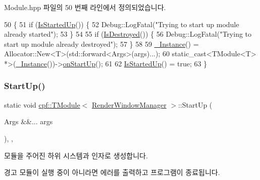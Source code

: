 Module.\+hpp 파일의 50 번째 라인에서 정의되었습니다.


\begin{DoxyCode}
50                                             \{
51             \textcolor{keywordflow}{if} (\hyperlink{classcpf_1_1_t_module_a73732afee7131dad652bf3e00c75cef9}{IsStartedUp}()) \{
52                 Debug::LogFatal(\textcolor{stringliteral}{"Trying to start up module already started"});
53             \}
54 
55             \textcolor{keywordflow}{if} (\hyperlink{classcpf_1_1_t_module_a9f70f0a70ac59b13b7a874f82c877337}{IsDestroyed}()) \{
56                 Debug::LogFatal(\textcolor{stringliteral}{"Trying to start up module already destroyed"});
57             \}
58 
59             \hyperlink{classcpf_1_1_t_module_a06ab8af8ea6b294959937fd2bbc1e615}{\_Instance}() = Allocator::New<T>(std::forward<Args>(args)...);
60             \textcolor{keyword}{static\_cast<}TModule<T> *\textcolor{keyword}{>}(\hyperlink{classcpf_1_1_t_module_a06ab8af8ea6b294959937fd2bbc1e615}{\_Instance}())->\hyperlink{classcpf_1_1_t_module_a4eb83b0848794e422d2d345439f51a04}{onStartUp}();
61 
62             \hyperlink{classcpf_1_1_t_module_a73732afee7131dad652bf3e00c75cef9}{IsStartedUp}() = \textcolor{keyword}{true};
63         \}
\end{DoxyCode}
\mbox{\label{classcpf_1_1_t_module_ac553266ad6255da045ef3f34b0f9bc16}} 
\subsubsection{\texorpdfstring{Start\+Up()}{StartUp()}\hspace{0.1cm}{\footnotesize\ttfamily [2/2]}}
{\footnotesize\ttfamily static void \hyperlink{classcpf_1_1_t_module}{cpf\+::\+T\+Module}$<$ \hyperlink{classcpf_1_1_render_window_manager}{Render\+Window\+Manager}  $>$\+::Start\+Up (\begin{DoxyParamCaption}\item[{Args \&\&...}]{args }\end{DoxyParamCaption})\hspace{0.3cm}{\ttfamily [inline]}, {\ttfamily [static]}, {\ttfamily [inherited]}}

모듈을 주어진 하위 시스템과 인자로 생성합니다. \begin{DoxyWarning}{경고}
모듈이 실행 중이 아니라면 에러를 출력하고 프로그램이 종료됩니다. 
\end{DoxyWarning}


